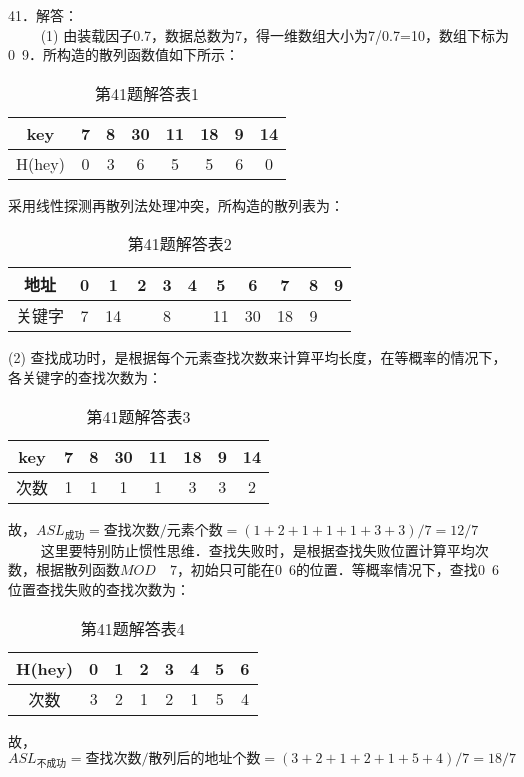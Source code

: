 41．解答：\\
$\qquad$ (1) 由装载因子0.7，数据总数为7，得一维数组大小为7/0.7=10，数组下标为0~9．所构造的散列函数值如下所示：
\begin{table}[ht]
\centering
\caption{第41题解答表1}\label{CSN10_tab2}
\begin{tabular}{|c|c|c|c|c|c|c|c|}
\hline
key & 7 & 8 & 30 & 11 & 18 & 9 & 14 \\
\hline
H(hey) & 0 & 3 & 6 & 5 & 5 & 6 & 0 \\
\hline
\end{tabular}
\end{table}
采用线性探测再散列法处理冲突，所构造的散列表为： 
\begin{table}[ht]
\centering
\caption{第41题解答表2}\label{CSN10_tab3}
\begin{tabular}{|c|c|c|c|c|c|c|c|c|c|c|}
\hline
地址 & 0 & 1 & 2 & 3 & 4 & 5 & 6 & 7 & 8 & 9 \\
\hline
关键字 & 7 & 14 &  & 8 &  & 11 & 30 & 18 & 9 &  \\
\hline
\end{tabular}
\end{table}
(2) 查找成功时，是根据每个元素查找次数来计算平均长度，在等概率的情况下，各关键字的查找次数为：\\
\begin{table}[ht]
\centering
\caption{第41题解答表3}\label{CSN10_tab4}
\begin{tabular}{|c|c|c|c|c|c|c|c|}
\hline
key & 7 & 8 & 30 & 11 & 18 & 9 & 14 \\
\hline
次数 & 1 & 1 & 1 & 1 & 3 & 3 & 2 \\
\hline
\end{tabular}
\end{table}
故，$ASL_{\text{成功}}=$查找次数$/$元素个数$=(1+2+1+1+1+3+3)/7=12/7$  \\
$\qquad$ 这里要特别防止惯性思维．查找失败时，是根据查找失败位置计算平均次数，根据散列函数$MOD  \quad 7$，初始只可能在$0$~$6$的位置．等概率情况下，查找$0$~$6$位置查找失败的查找次数为：\\
\begin{table}[ht]
\centering
\caption{第41题解答表4}\label{CSN10_tab5}
\begin{tabular}{|c|c|c|c|c|c|c|c|}
\hline
H(hey) & 0 & 1 & 2 & 3 & 4 & 5 & 6 \\
\hline
次数 & 3 & 2 & 1 & 2 & 1 & 5 & 4 \\
\hline
\end{tabular}
\end{table}
故，$ASL_{\text{不成功}}=\text{查找次数}/\text{散列后的地址个数}=(3+2+1+2+1+5+4)/7=18/7$

